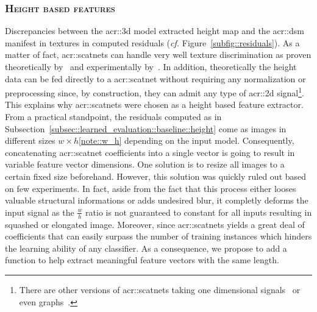         \subsubsection{\textsc{Height based features}}
            Discrepancies between the \gls{acr::3d} model extracted height map and the \gls{acr::dsm} manifest in textures in computed residuals (\textit{cf.} Figure~\ref{subfig::residuals}).
            As a matter of fact, \glspl{acr::scatnet} can handle very well texture discrimination as proven theoretically by~\textcite{mallat2012group} and experimentally by~\textcite{bruna2013invariant,sifre2013rotation}.
            In addition, theoretically the height data can be fed directly to a \gls{acr::scatnet} without requiring any normalization or preprocessing since, by construction, they can admit any type of \gls{acr::2d} signal\footnote{There are other versions of \glspl{acr::scatnet} taking one dimensional signals~\parencite{anden2014deep} or even graphs~\parencite{eickenberg2018solid}.}.
            This explains why \glspl{acr::scatnet} were chosen as a height based feature extractor.\\

            From a practical standpoint, the residuals computed as in Subsection~\ref{subsec::learned_evaluation::baseline::height} come as images in different sizes \(w \times h\)\cref{note::w_h} depending on the input model.
            Consequently, concatenating \gls{acr::scatnet} coefficients into a single vector is going to result in variable feature vector dimensions.
            One solution is to resize all images to a certain fixed size beforehand.
            However, this solution was quickly ruled out based on few experiments.
            In fact, aside from the fact that this process either looses valuable structural informations or adds undesired blur, it completly deforms the input signal as the \(\frac{w}{h}\) ratio is not guaranteed to constant for all inputs resulting in squashed or elongated image.
            Moreover, since \glspl{acr::scatnet} yields a great deal of coefficients that can easily surpass the number of training instances which hinders the learning ability of any classifier.
            As a consequence, we propose to add a function to help extract meaningful feature vectors with the same length.\\


